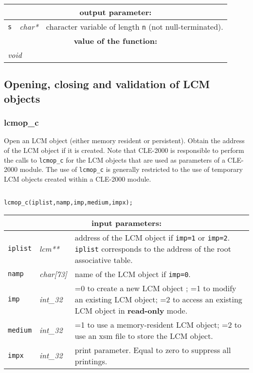 \vskip 0.8cm

\noindent
\begin{tabular}{|p{1.5cm}|p{2cm}|p{11cm}|}
\hline
\multicolumn{3}{|c|}{\bf output parameter:} \\
\hline
{\tt s} & {\it char*} & character variable of length {\tt n} (not null-terminated). \\
\hline
\multicolumn{3}{|c|}{\bf value of the function:} \\
\hline
\multicolumn{2}{|l|}{\it void} &  \\
\hline
\end{tabular}

\subsection{Opening, closing and validation of LCM objects}

\subsubsection{lcmop\_c}

Open an LCM object (either memory resident or persistent). Obtain the address of the LCM
object if it is created. Note that CLE-2000 is responsible to perform the calls to
{\tt lcmop\_c} for the LCM objects that are used as parameters of a CLE-2000 module. The use
of {\tt lcmop\_c} is generally restricted to the use of temporary LCM objects created within a CLE-2000 module.

\begin{verbatim}

lcmop_c(iplist,namp,imp,medium,impx);
\end{verbatim}

\noindent
\begin{tabular}{|p{1.5cm}|p{2cm}|p{11cm}|}
\hline
\multicolumn{3}{|c|}{\bf input parameters:} \\
\hline
{\tt iplist} & {\it lcm**} & address of the LCM object if {\tt imp=1} or {\tt imp=2}. {\tt iplist} corresponds to the address of the root associative table. \\
\hline
{\tt namp} & {\it char[73]} & name of the LCM object if {\tt imp=0}. \\
\hline
{\tt imp} & {\it int\_32} & =0 to create a new LCM object ; 
                                  =1 to modify an existing LCM object; 
				  =2 to access an existing LCM object in {\bf read-only} mode. \\
\hline
{\tt medium} & {\it int\_32} & =1 to use a memory-resident LCM object; 
                                     =2 to use an {\sc xsm} file to store the LCM object. \\
\hline
{\tt impx} & {\it int\_32} & print parameter. Equal to zero to suppress all printings. \\
\hline
\end{tabular}

